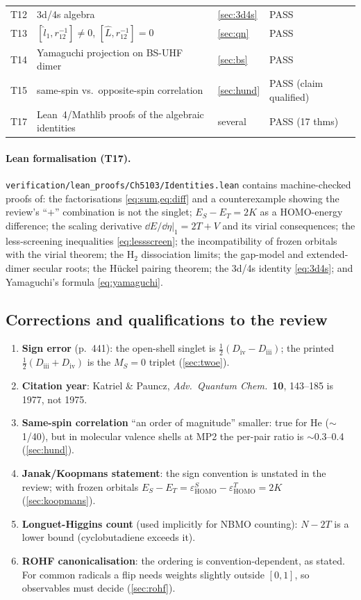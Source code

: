 \begin{center}
\begin{tabular}{llll}
T12 & 3d/4s algebra & \ref{sec:3d4s} & PASS\\
T13 & $[\hat l_1,r_{12}^{-1}]\ne0$, $[\hat L,r_{12}^{-1}]=0$ & \ref{sec:qn} & PASS\\
T14 & Yamaguchi projection on BS-UHF dimer & \ref{sec:bs} & PASS\\
T15 & same-spin vs.\ opposite-spin correlation & \ref{sec:hund} & PASS (claim qualified)\\
T17 & Lean~4/Mathlib proofs of the algebraic identities & several & PASS (17 thms)\\
\bottomrule
\end{tabular}
\end{center}

\paragraph{Lean formalisation (T17).} \texttt{verification/lean\_proofs/Ch5103/Identities.lean} contains
machine-checked proofs of: the factorisations \cref{eq:sum,eq:diff} and a counterexample showing the
review's ``$+$'' combination is not the singlet; $E_S-E_T=2K$ as a HOMO-energy difference; the scaling
derivative $\dd E/\dd\eta|_1=2T+V$ and its virial consequences; the less-screening inequalities
\cref{eq:lessscreen}; the incompatibility of frozen orbitals with the virial theorem; the H$_2$ dissociation
limits; the gap-model and extended-dimer secular roots; the Hückel pairing theorem; the 3d/4s identity
\cref{eq:3d4s}; and Yamaguchi's formula \cref{eq:yamaguchi}.

\subsection{Corrections and qualifications to the review}
\begin{enumerate}
  \item \textbf{Sign error} (p.~441): the open-shell singlet is $\tfrac12(D_{\text{iv}}-D_{\text{iii}})$; the printed
        $\tfrac12(D_{\text{iii}}+D_{\text{iv}})$ is the $M_S=0$ triplet (\cref{sec:twoe}).
  \item \textbf{Citation year}: Katriel \& Pauncz, \emph{Adv.\ Quantum Chem.}\ \textbf{10}, 143--185 is 1977, not 1975.
  \item \textbf{Same-spin correlation} ``an order of magnitude'' smaller: true for He ($\sim$1/40), but in molecular
        valence shells at MP2 the per-pair ratio is $\sim$0.3--0.4 (\cref{sec:hund}).
  \item \textbf{Janak/Koopmans statement}: the sign convention is unstated in the review; with frozen orbitals
        $E_S-E_T=\varepsilon^S_{\text{HOMO}}-\varepsilon^T_{\text{HOMO}}=2K$ (\cref{sec:koopmans}).
  \item \textbf{Longuet-Higgins count} (used implicitly for NBMO counting): $N-2T$ is a lower bound
        (cyclobutadiene exceeds it).
  \item \textbf{ROHF canonicalisation}: the ordering is convention-dependent, as stated. For common radicals
        a flip needs weights slightly outside $[0,1]$, so observables must decide (\cref{sec:rohf}).
\end{enumerate}


